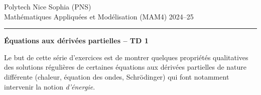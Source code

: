 \documentclass[12pt,a4paper]{article}
\begin{document}
 \hfill Polytech Nice Sophia (PNS)\\
\noindent Math\'ematiques Appliqu\'ees et Mod\'elisation (MAM4) \hfill 2024--25 \\

\hrule

\bigskip

\begin{center}{\bf \'Equations aux d\'eriv\'ees partielles --
TD 1}\end{center}

\bigskip

Le but de cette s\'erie d'exercices est de montrer quelques
propri\'et\'es qualitatives des solutions r\'eguli\`eres de certaines \'equations aux d\'eriv\'ees
partielles de nature diff\'erente (chaleur, \'equation des ondes, Schr\"odinger) qui font notamment intervenir la notion {\it d'\'energie}.
\end{document}

